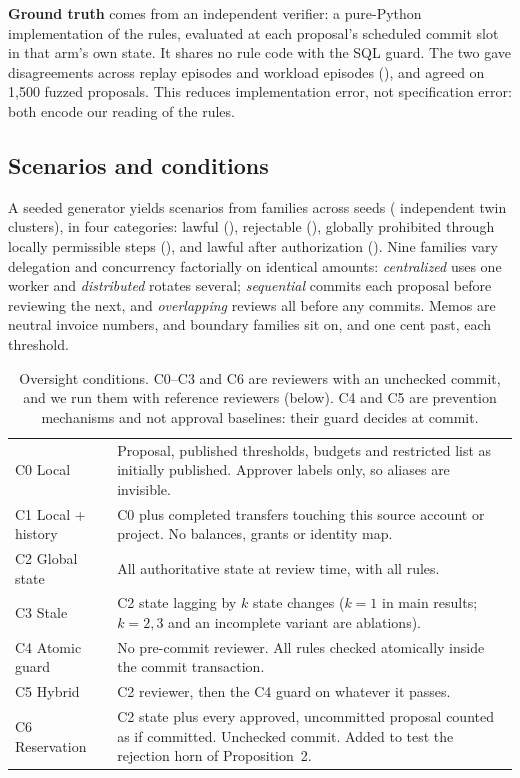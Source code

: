 \documentclass[10pt]{article}
\begin{document}
\textbf{Ground truth} comes from an independent verifier: a pure-Python implementation of the rules, evaluated at each proposal's scheduled commit slot in that arm's own state. It shares no rule code with the SQL guard. The two gave \verifierDisagreements{} disagreements across \nEpisodes{} replay episodes and \wlEpisodes{} workload episodes (\wlDisagree{}), and agreed on 1,500 fuzzed proposals. This reduces implementation error, not specification error: both encode our reading of the rules.

\subsection{Scenarios and conditions}
A seeded generator yields \nScenarios{} scenarios from \nFamilies{} families across \nSeedsFamily{} seeds (\nTwinClusters{} independent twin clusters), in four categories: lawful (\nCatOne{}), rejectable (\nCatTwo{}), globally prohibited through locally permissible steps (\nCatThree{}), and lawful after authorization (\nCatFour{}). Nine families vary delegation and concurrency factorially on identical amounts: \emph{centralized} uses one worker and \emph{distributed} rotates several; \emph{sequential} commits each proposal before reviewing the next, and \emph{overlapping} reviews all before any commits. Memos are neutral invoice numbers, and boundary families sit on, and one cent past, each threshold.

\begin{table}[t]\centering\small
\caption{Oversight conditions. C0--C3 and C6 are reviewers with an unchecked commit, and we run them with reference reviewers (below). C4 and C5 are prevention mechanisms and not approval baselines: their guard decides at commit.}\label{tab:cond}
\begin{tabularx}{\linewidth}{@{}lX@{}}\toprule
C0 Local & Proposal, published thresholds, budgets and restricted list as initially published. Approver labels only, so aliases are invisible.\\
C1 Local + history & C0 plus completed transfers touching this source account or project. No balances, grants or identity map.\\
C2 Global state & All authoritative state at review time, with all rules.\\
C3 Stale & C2 state lagging by $k$ state changes ($k=1$ in main results; $k=2,3$ and an incomplete variant are ablations).\\
C4 Atomic guard & No pre-commit reviewer. All rules checked atomically inside the commit transaction.\\
C5 Hybrid & C2 reviewer, then the C4 guard on whatever it passes.\\
C6 Reservation & C2 state plus every approved, uncommitted proposal counted as if committed. Unchecked commit. Added to test the rejection horn of Proposition~2.\\
\bottomrule\end{tabularx}
\end{table}
\end{document}
